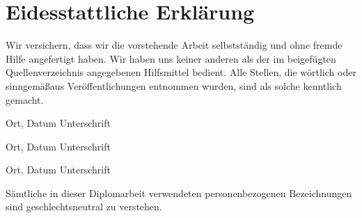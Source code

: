 \chapter*{Eidesstattliche Erkl\"arung}

Wir versichern, dass wir die vorstehende Arbeit selbstst\"andig und ohne fremde Hilfe angefertigt haben. Wir haben uns keiner anderen als der im beigef\"ugten Quellenverzeichnis angegebenen Hilfsmittel bedient. Alle Stellen, die w\"ortlich oder sinngem\"a\ss aus Ver\"offentlichungen entnommen wurden, sind als solche kenntlich gemacht.


\vspace{4cm}

\hspace{2cm} Ort, Datum \hfill Unterschrift \hspace{2cm}

\vspace{2cm}

\hspace{2cm} Ort, Datum \hfill Unterschrift \hspace{2cm}

\vspace{2cm}

\hspace{2cm} Ort, Datum \hfill Unterschrift \hspace{2cm}

\vspace{3cm}

\begin{center}
S\"amtliche in dieser Diplomarbeit verwendeten personenbezogenen Bezeichnungen sind geschlechtsneutral zu verstehen.
\end{center}